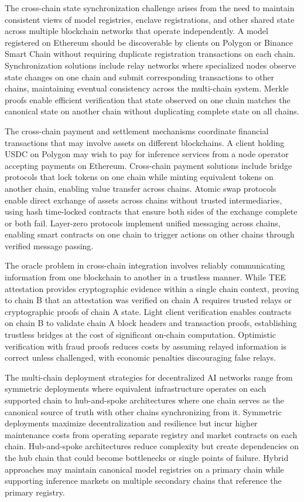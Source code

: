 The cross-chain state synchronization challenge arises from the need to maintain consistent views of model registries, enclave registrations, and other shared state across multiple blockchain networks that operate independently. A model registered on Ethereum should be discoverable by clients on Polygon or Binance Smart Chain without requiring duplicate registration transactions on each chain. Synchronization solutions include relay networks where specialized nodes observe state changes on one chain and submit corresponding transactions to other chains, maintaining eventual consistency across the multi-chain system. Merkle proofs enable efficient verification that state observed on one chain matches the canonical state on another chain without duplicating complete state on all chains.

The cross-chain payment and settlement mechanisms coordinate financial transactions that may involve assets on different blockchains. A client holding USDC on Polygon may wish to pay for inference services from a node operator accepting payments on Ethereum. Cross-chain payment solutions include bridge protocols that lock tokens on one chain while minting equivalent tokens on another chain, enabling value transfer across chains. Atomic swap protocols enable direct exchange of assets across chains without trusted intermediaries, using hash time-locked contracts that ensure both sides of the exchange complete or both fail. Layer-zero protocols implement unified messaging across chains, enabling smart contracts on one chain to trigger actions on other chains through verified message passing.

The oracle problem in cross-chain integration involves reliably communicating information from one blockchain to another in a trustless manner. While TEE attestation provides cryptographic evidence within a single chain context, proving to chain B that an attestation was verified on chain A requires trusted relays or cryptographic proofs of chain A state. Light client verification enables contracts on chain B to validate chain A block headers and transaction proofs, establishing trustless bridges at the cost of significant on-chain computation. Optimistic verification with fraud proofs reduces costs by assuming relayed information is correct unless challenged, with economic penalties discouraging false relays.

The multi-chain deployment strategies for decentralized AI networks range from symmetric deployments where equivalent infrastructure operates on each supported chain to hub-and-spoke architectures where one chain serves as the canonical source of truth with other chains synchronizing from it. Symmetric deployments maximize decentralization and resilience but incur higher maintenance costs from operating separate registry and market contracts on each chain. Hub-and-spoke architectures reduce complexity but create dependencies on the hub chain that could become bottlenecks or single points of failure. Hybrid approaches may maintain canonical model registries on a primary chain while supporting inference markets on multiple secondary chains that reference the primary registry.


